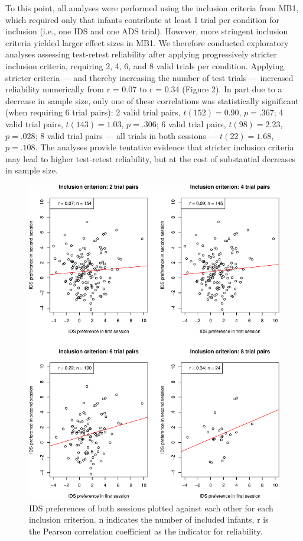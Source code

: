 \documentclass[
  man,floatsintext]{apa6}
\begin{document}
To this point, all analyses were performed using the inclusion criteria from MB1, which required only that infants contribute at least 1 trial per condition for inclusion (i.e., one IDS and one ADS trial).
However, more stringent inclusion criteria yielded larger effect sizes in MB1.
We therefore conducted exploratory analyses assessing test-retest reliability after applying progressively stricter inclusion criteria, requiring 2, 4, 6, and 8 valid trials per condition.
Applying stricter criteria --- and thereby increasing the number of test trials --- increased reliability numerically from r = 0.07 to r = 0.34 (Figure 2).
In part due to a decrease in sample size, only one of these correlations was statistically significant (when requiring 6 trial pairs): 2 valid trial pairs, \(t(152) = 0.90\), \(p = .367\); 4 valid trial pairs, \(t(143) = 1.03\), \(p = .306\); 6 valid trial pairs, \(t(98) = 2.23\), \(p = .028\); 8 valid trial pairs --- all trials in both sessions --- \(t(22) = 1.68\), \(p = .108\).
The analyses provide tentative evidence that stricter inclusion criteria may lead to higher test-retest reliability, but at the cost of substantial decreases in sample size.

\begin{figure}

{\centering \includegraphics[width=5in]{Retest_current_draft_files/figure-latex/unnamed-chunk-8-1} 

}

\caption{IDS preferences of both sessions plotted against each other for each inclusion criterion. n indicates the number of included infants, r is the Pearson correlation coefficient as the indicator for reliability.}\label{fig:unnamed-chunk-8}
\end{figure}
\end{document}
